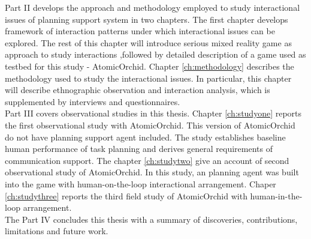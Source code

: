 Part II develops the approach and methodology employed to study interactional issues of planning support system in two chapters. The first chapter develops framework of interaction patterns under which interactional issues can be explored. The rest of this chapter will introduce serious mixed reality game as approach to study interactions  ,followed by detailed description of a game used as testbed for this study - AtomicOrchid. Chapter \ref{ch:methodology} describes the methodology used to study the interactional issues. In particular, this chapter will describe ethnographic observation and interaction analysis, which is supplemented by interviews and questionnaires. \\ 

Part III covers observational studies in this thesis. Chapter \ref{ch:studyone} reports the first observational study with AtomicOrchid. This version of AtomicOrchid do not have planning support agent included. The study establishes baseline human performance of task planning and derives general requirements of communication support. The chapter \ref{ch:studytwo} give an account of second observational study of AtomicOrchid. In this study, an planning agent was built into the game with human-on-the-loop interactional arrangement. Chaper \ref{ch:studythree} reports the third field study of AtomicOrchid with human-in-the-loop arrangement. \\ 

The Part IV concludes this thesis with a summary of discoveries, contributions, limitations and future work.\\









